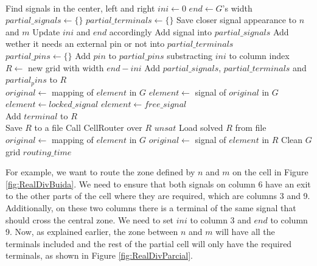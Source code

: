 \small
\begin{algorithmic}
 \\
\State Find signals in the center, left and right
\State $ini \gets 0$
\State $end \gets G$'s width
\State $partial\_signals \gets \{\}$
\State $partial\_terminals \gets \{\}$
		\State Save closer signal appearance to $n$ and $m$
		\State Update $ini$ and $end$ accordingly
	\EndIf
		\State Add signal into $partial\_signals$
		\State Add wether it needs an external pin or not into $partial\_terminals$
	\EndIf
\EndFor \\

\State $partial\_pins \gets \{\}$
		\State Add $pin$ to $partial\_pins$ substracting $ini$ to column index
	\EndIf
\EndFor \\

\State $R \gets$ new grid with width $end - ini$ 
\State Add $partial\_signals$, $partial\_terminals$ and $partial_pins$ to $R$ \\

	\State $original \gets$ mapping of $element$ in $G$ 
		\State $element \gets $ signal of $original$ in $G$
		\State $element \gets locked\_signal$ 
	\Else
		\State $element \gets free\_signal$
	\EndIf
\EndFor \\

	\State Add $terminal$ to $R$
\EndFor \\

\State Save $R$ to a file
\State Call CellRouter over $R$
		\State \Return $unsat$
\EndIf
\State Load solved $R$ from file \\

	\State $original \gets$ mapping of $element$ in $G$ 
		\State $original \gets $ signal of $element$ in $R$
	\EndIf
\EndFor
\State Clean $G$ grid  
\State \Return $routing\_time$ \\
\EndFunction
\end{algorithmic} 
\normalsize

For example, we want to route the zone defined by $n$ and $m$ on the cell in Figure \ref{fig:RealDivBuida}. We need to ensure that both signals on column 6 have an exit to the other parts of the cell where they are required, which are columns 3 and 9. Additionally, on these two columns there is a terminal of the same signal that should cross the central zone. We need to set $ini$ to column 3 and $end$ to column 9. Now, as explained earlier, the zone between $n$ and $m$ will have all the terminals included and the rest of the partial cell will only have the required terminals, as shown in Figure \ref{fig:RealDivParcial}. \\

